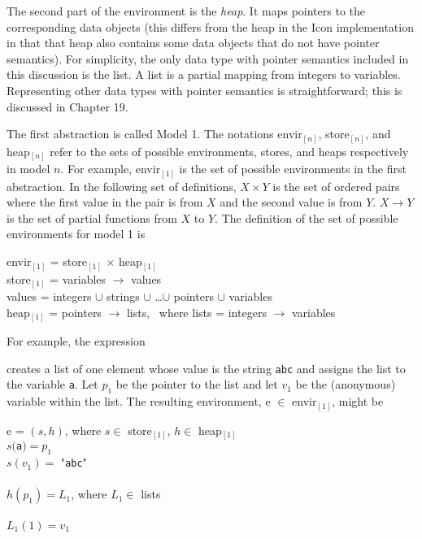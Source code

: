 The second part of the environment is the \textit{heap}. It maps
pointers to the corresponding data objects (this differs from the heap
in the Icon implementation in that that heap also contains some data
objects that do not have pointer semantics). For simplicity, the only
data type with pointer semantics included in this discussion is the
list.  A list is a partial mapping from integers to
variables. Representing other data types with pointer semantics is
straightforward; this is discussed in Chapter 19.

The first abstraction is called Model 1. The notations envir$_{[n]}$,
store$_{[n]}$, and heap$_{[n]}$ refer to the sets of possible
environments, stores, and heaps respectively in model $n$. For
example, envir$_{[1]}$ is the set of possible environments in the
first abstraction. In the following set of definitions, $X \times Y$
is the set of ordered pairs where the first value in the pair is from
$X$ and the second value is from $Y$. $ X \rightarrow Y$ is the set of
partial functions from $X$ to $Y$. The definition of the set of
possible environments for model 1 is

\goodbreak
\begin{specialcode}{}
\>envir$_{[1]}$ = store$_{[1]}$ $\times$ heap$_{[1]}$\\
\>store$_{[1]}$ = variables $\rightarrow$ values\\
\>values       = integers $\cup$ strings $\cup$ \ldots $\cup$ pointers $\cup$ variables\\
\>heap$_{[1]}$  = pointers \textrm{${\rightarrow}$} lists,~%
                 where lists = integers $\rightarrow$ variables\\
\end{specialcode}


For example, the expression 


\noindent creates a list of one element whose value is the string \texttt{abc}
and assigns the list to the variable \texttt{a}. Let $p_1$ be the
pointer to the list and let $v_1$ be the (anonymous) variable within
the list. The resulting environment, e $\in$ envir$_{[1]}$, might be

\goodbreak
\begin{specialcode}{}
\>e = $(s,h)$, where $s \in $ store$_{[1]}$, $h \in $ heap$_{[1]}$\\
\>$s($\texttt{a}$) = p_1$\\
\>$s(v_1) = $ "\texttt{abc}"\\
\\
\>$h(p_1) = L_1$, where $L_1 \in$ lists\\
\\
\>$L_1(1) = v_1$\\
\end{specialcode}

